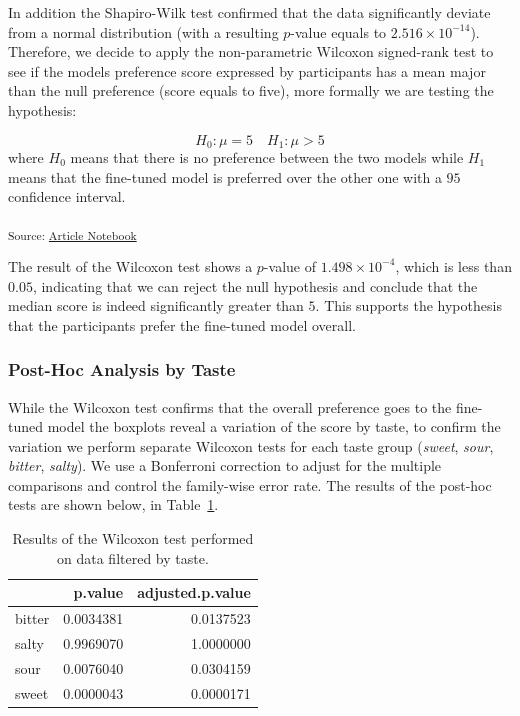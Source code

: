 \documentclass[
  letterpaper,
  DIV=11,
  numbers=noendperiod]{scrartcl}
\begin{document}
In addition the Shapiro-Wilk test confirmed that the data significantly
deviate from a normal distribution (with a resulting \(p\)-value equals
to \(\ensuremath{2.516\times 10^{-14}}\)). Therefore, we decide to apply
the non-parametric Wilcoxon signed-rank test to see if the models
preference score expressed by participants has a mean major than the
null preference (score equals to five), more formally we are testing the
hypothesis:

\[
H_0: \mu = 5 \quad H_1: \mu > 5
\] where \(H_0\) means that there is no preference between the two
models while \(H_1\) means that the fine-tuned model is preferred over
the other one with a \(95%
\) confidence interval.

\textsubscript{Source:
\href{https://matteospanio.github.io/multimodal-symphony-survey-analysis/index.qmd.html}{Article
Notebook}}

The result of the Wilcoxon test shows a \(p\)-value of
\(\ensuremath{1.498\times 10^{-4}}\), which is less than \(0.05\),
indicating that we can reject the null hypothesis and conclude that the
median score is indeed significantly greater than \(5\). This supports
the hypothesis that the participants prefer the fine-tuned model
overall.

\subsubsection{Post-Hoc Analysis by
Taste}\label{post-hoc-analysis-by-taste}

While the Wilcoxon test confirms that the overall preference goes to the
fine-tuned model the boxplots reveal a variation of the score by taste,
to confirm the variation we perform separate Wilcoxon tests for each
taste group (\emph{sweet}, \emph{sour}, \emph{bitter}, \emph{salty}). We
use a Bonferroni correction to adjust for the multiple comparisons and
control the family-wise error rate. The results of the post-hoc tests
are shown below, in Table~\ref{tbl-wilcoxon-taste}.

\begin{longtable}[]{@{}lrr@{}}

\caption{\label{tbl-wilcoxon-taste}Results of the Wilcoxon test
performed on data filtered by taste.}

\tabularnewline

\toprule\noalign{}
& p.value & adjusted.p.value \\
\midrule\noalign{}
\endhead
\bottomrule\noalign{}
\endlastfoot
bitter & 0.0034381 & 0.0137523 \\
salty & 0.9969070 & 1.0000000 \\
sour & 0.0076040 & 0.0304159 \\
sweet & 0.0000043 & 0.0000171 \\

\end{longtable}
\end{document}

